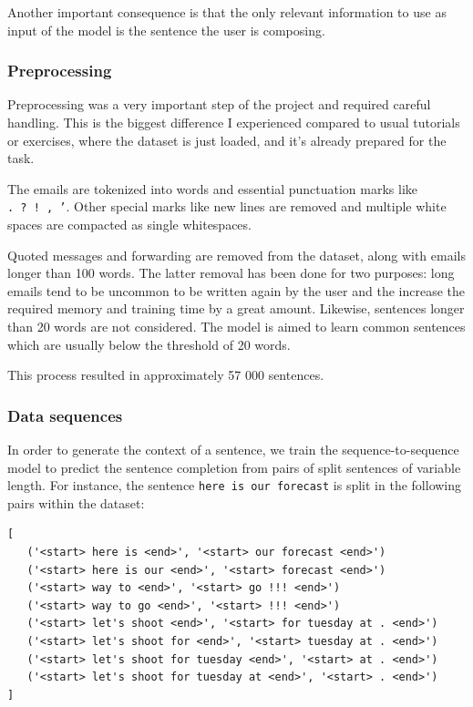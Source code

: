 \documentclass{article}
\begin{document}
Another important consequence is that the only relevant information to use as input of the model is the sentence the user is composing.

\subsubsection{Preprocessing}

Preprocessing was a very important step of the project and required careful handling. This is the biggest difference I experienced compared to usual tutorials or exercises, where the dataset is just loaded, and it's already prepared for the task.

The emails are tokenized into words and essential punctuation marks like \texttt{.\ ?\ !\ ,\ '}. Other special marks like new lines are removed and multiple white spaces are compacted as single whitespaces.

Quoted messages and forwarding are removed from the dataset, along with emails longer than 100 words. The latter removal has been done for two purposes: long emails tend to be uncommon to be written again by the user and the increase the required memory and training time by a great amount. Likewise, sentences longer than 20 words are not considered. The model is aimed to learn common sentences which are usually below the threshold of 20 words.

This process resulted in approximately 57 000 sentences.

\subsubsection{Data sequences}

In order to generate the context of a sentence, we train the sequence-to-sequence model to predict the sentence completion from pairs of split sentences of variable length. For instance, the sentence \texttt{here\ is\ our\ forecast} is split in the following pairs within the dataset:

\begin{lstlisting}
[
   ('<start> here is <end>', '<start> our forecast <end>')
   ('<start> here is our <end>', '<start> forecast <end>')
   ('<start> way to <end>', '<start> go !!! <end>')
   ('<start> way to go <end>', '<start> !!! <end>')
   ('<start> let's shoot <end>', '<start> for tuesday at . <end>')
   ('<start> let's shoot for <end>', '<start> tuesday at . <end>')
   ('<start> let's shoot for tuesday <end>', '<start> at . <end>')
   ('<start> let's shoot for tuesday at <end>', '<start> . <end>')
]
\end{lstlisting}
\end{document}
